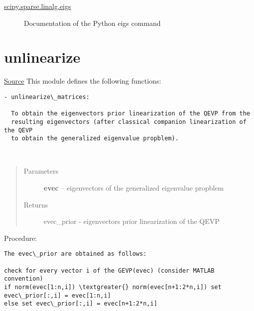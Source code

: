 \documentclass[letterpaper,10pt,english]{sphinxmanual}
\begin{document}

\begin{description}
\item[{\href{http://docs.scipy.org/doc/scipy-0.14.0/reference/generated/scipy.sparse.linalg.eigs.html}{scipy.sparse.linalg.eigs}}] \leavevmode
Documentation of the Python eigs command

\end{description}




\section{unlinearize}
\label{index:unlinearize}
\href{https://bitbucket.org/akadar/brakesqueal0.1/src/master/brake/initialize/unlinearize.py?at=master}{Source}
\label{index:module-brake.initialize.unlinearize}
This module defines the following functions:

\begin{Verbatim}[commandchars=\\\{\}]
- unlinearize\_matrices:
  
  To obtain the eigenvectors prior linearization of the QEVP from the 
  resulting eigenvectors (after classical companion linearization of the QEVP
  to obtain the generalized eigenvalue propblem).
\end{Verbatim}

\begin{fulllineitems}
\label{index:brake.initialize.unlinearize.unlinearize_matrices}~\begin{quote}\begin{description}
\item[{Parameters}] \leavevmode
\textbf{evec} -- eigenvectors of the generalized eigenvalue propblem

\item[{Returns}] \leavevmode
evec\_prior - eigenvectors prior linearization of the QEVP

\end{description}\end{quote}

Procedure:

\begin{Verbatim}[commandchars=\\\{\}]
The evec\_prior are obtained as follows:

check for every vector i of the GEVP(evec) (consider MATLAB convention)
if norm(evec[1:n,i]) \textgreater{} norm(evec[n+1:2*n,i]) set evec\_prior[:,i] = evec[1:n,i]
else set evec\_prior[:,i] = evec[n+1:2*n,i]
\end{Verbatim}

\end{fulllineitems}
\end{document}
